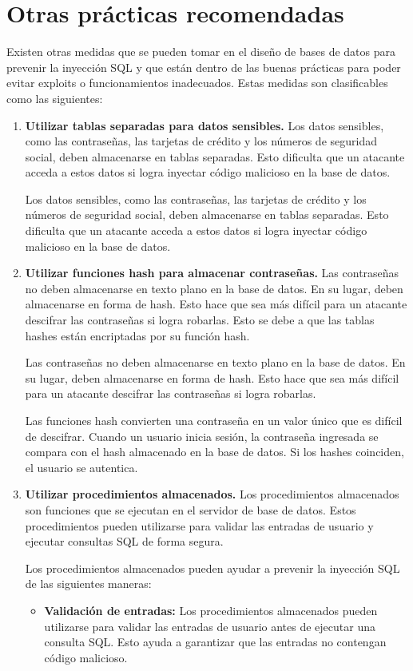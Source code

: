 \documentclass[11pt]{report}
\begin{document}
\section{Otras prácticas recomendadas}
Existen otras medidas que se pueden tomar en el diseño de bases de datos para prevenir la inyección SQL y que están dentro de las buenas prácticas para poder 
evitar exploits o funcionamientos inadecuados. Estas medidas son clasificables como las siguientes:
\begin{enumerate}
  \item \textbf{Utilizar tablas separadas para datos sensibles.} Los datos sensibles, como las contraseñas, las tarjetas
  de crédito y los números de seguridad social, deben almacenarse en tablas separadas. Esto dificulta que un atacante 
  acceda a estos datos si logra inyectar código malicioso en la base de datos.

  Los datos sensibles, como las contraseñas, las tarjetas de crédito y los números de seguridad social, deben almacenarse
  en tablas separadas. Esto dificulta que un atacante acceda a estos datos si logra inyectar código malicioso en la base
  de datos.
  
  \item \textbf{Utilizar funciones hash para almacenar contraseñas.} Las contraseñas no deben almacenarse en texto plano en
  la base de datos. En su lugar, deben almacenarse en forma de hash. Esto hace que sea más difícil para un atacante descifrar
  las contraseñas si logra robarlas. Esto se debe a que las tablas hashes están encriptadas por su función hash.

  Las contraseñas no deben almacenarse en texto plano en la base de datos. En su lugar, deben almacenarse en forma de hash.
  Esto hace que sea más difícil para un atacante descifrar las contraseñas si logra robarlas.
  
  Las funciones hash convierten una contraseña en un valor único que es difícil de descifrar. Cuando un usuario inicia sesión,
  la contraseña ingresada se compara con el hash almacenado en la base de datos. Si los hashes coinciden, el usuario se autentica.
  
  \item \textbf{Utilizar procedimientos almacenados.} Los procedimientos almacenados son funciones que se ejecutan en el servidor
  de base de datos. Estos procedimientos pueden utilizarse para validar las entradas de usuario y ejecutar consultas SQL de forma segura.
  
  Los procedimientos almacenados pueden ayudar a prevenir la inyección SQL de las siguientes maneras:
  \begin{itemize}
    \item \textbf{Validación de entradas:} Los procedimientos almacenados pueden utilizarse para validar las entradas de usuario antes de
    ejecutar una consulta SQL. Esto ayuda a garantizar que las entradas no contengan código malicioso.
    

\end{itemize}
\end{enumerate}
\end{document}
